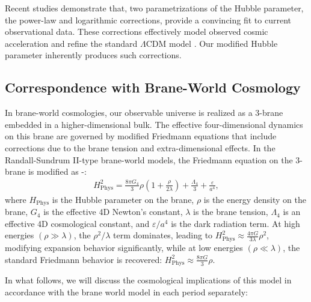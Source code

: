 \documentclass[12pt]{article}  %
\def\bea{\begin{eqnarray}}
\def\eea{\end{eqnarray}}
\begin{document}
Recent studies demonstrate that, two parametrizations of the Hubble parameter, the power-law and logarithmic corrections, provide a convincing fit to current observational data. These corrections effectively model observed cosmic acceleration and refine the standard 
$\Lambda$CDM model \cite{41}. Our modified Hubble parameter inherently produces such corrections.

	

\subsection{Correspondence with Brane-World Cosmology} 
In brane-world cosmologies, our observable universe is realized as a 3-brane embedded in a higher-dimensional bulk. The effective four-dimensional dynamics on this brane are governed by modified Friedmann equations that include corrections due to the brane tension and extra-dimensional effects. In the Randall-Sundrum II-type brane-world models, the Friedmann equation on the 3-brane is modified as \cite{42}-\cite{44}:  
\bea  
	H_{\mathrm{Phys}}^{2} = \frac{8 \pi G_4}{3} \rho \left(1 + \frac{\rho}{2 \lambda}\right) + \frac{\Lambda_4}{3} + \frac{\varepsilon}{a^4},   
\eea 
where $H_{\mathrm{Phys}}$ is the Hubble parameter on the brane, $\rho$ is the energy density on the brane, $G_4$ is the effective 4D Newton’s constant, $\lambda$ is the brane tension, $\Lambda_4$ is an effective 4D cosmological constant, and $\varepsilon / a^{4}$ is the dark radiation term. At high energies $(\rho \gg \lambda)$, the $\rho^2 / \lambda$ term dominates, leading to  $	H_{\mathrm{Phys}}^{2} \approx \frac{4 \pi G}{3 \lambda} \rho^{2}$, modifying expansion behavior significantly, while at low energies $(\rho \ll \lambda)$, the standard Friedmann behavior is recovered: $	H_{\mathrm{Phys}}^2 \approx \frac{8 \pi G}{3} \rho $.  



In what follows, we will discuss the cosmological implications of this model in accordance with the brane world model in each period separately:
\end{document}
